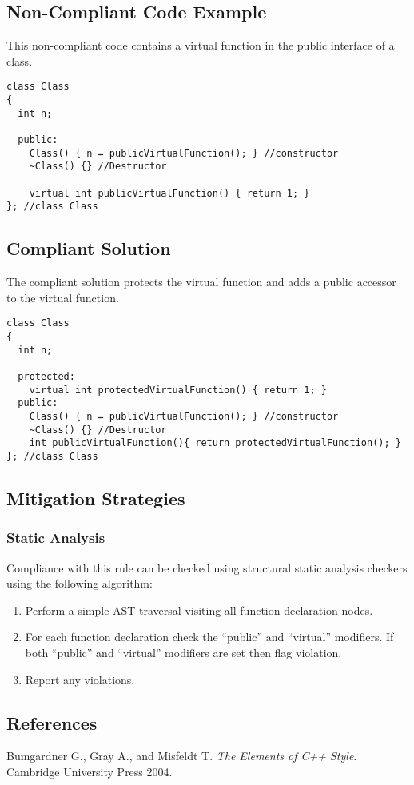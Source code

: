 \subsection{Non-Compliant Code Example}
This non-compliant code contains a virtual function in the public interface of a class.

\begin{verbatim}
class Class
{
  int n;

  public:
    Class() { n = publicVirtualFunction(); } //constructor
    ~Class() {} //Destructor

    virtual int publicVirtualFunction() { return 1; }
}; //class Class
\end{verbatim}

\subsection{Compliant Solution}
The compliant solution protects the virtual function and adds a public accessor to the virtual function.

\begin{verbatim}
class Class
{
  int n;

  protected:
    virtual int protectedVirtualFunction() { return 1; }
  public:
    Class() { n = publicVirtualFunction(); } //constructor
    ~Class() {} //Destructor
    int publicVirtualFunction(){ return protectedVirtualFunction(); }
}; //class Class
\end{verbatim}

\subsection{Mitigation Strategies}
\subsubsection{Static Analysis} 

Compliance with this rule can be checked using structural static analysis checkers using the following algorithm:

\begin{enumerate}
\item Perform a simple AST traversal visiting all function declaration nodes.
\item For each function declaration check the ``public'' and ``virtual'' modifiers. If both ``public'' and ``virtual'' modifiers are set then flag violation.
\item Report any violations. 
\end{enumerate}

\subsection{References}

Bumgardner G., Gray A., and Misfeldt T. {\it The Elements of C++ Style}. Cambridge University Press 2004.
